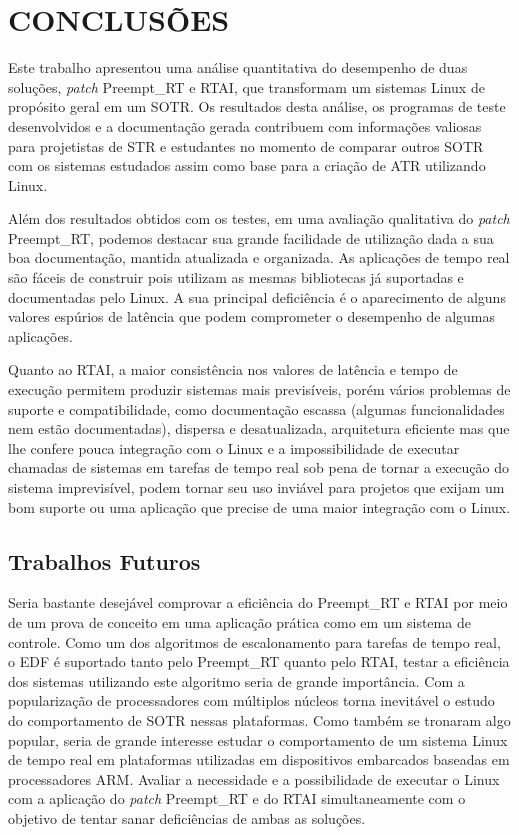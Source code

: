 \chapter{CONCLUSÕES}
\label{cap:conclusoes}
Este trabalho apresentou uma análise quantitativa do desempenho de duas soluções, \textit{patch} Preempt\_RT  e RTAI, que transformam um sistemas Linux de propósito geral em um SOTR. Os resultados desta análise, os programas de teste desenvolvidos e a documentação gerada contribuem com informações valiosas para projetistas de STR e estudantes no momento de comparar outros SOTR com os sistemas estudados assim como base para a criação de ATR utilizando Linux.

Além dos resultados obtidos com os testes, em uma avaliação qualitativa do \textit{patch} Preempt\_RT, podemos destacar sua grande facilidade de utilização dada a sua boa documentação, mantida atualizada e organizada. As aplicações de tempo real são fáceis de construir pois utilizam as mesmas bibliotecas já suportadas e documentadas pelo Linux. A sua principal deficiência é o aparecimento de alguns valores espúrios de latência que podem comprometer o desempenho de algumas aplicações.

Quanto ao RTAI, a maior consistência nos valores de latência e tempo de execução permitem produzir sistemas mais previsíveis, porém vários problemas de suporte e compatibilidade, como documentação escassa (algumas funcionalidades nem estão documentadas), dispersa e desatualizada, arquitetura eficiente mas que lhe confere pouca integração com o Linux e a impossibilidade de executar chamadas de sistemas em tarefas de tempo real sob pena de tornar a execução do sistema imprevisível, podem tornar seu uso inviável para projetos que exijam um bom suporte ou uma aplicação que precise de uma maior integração com o Linux.

\section{Trabalhos Futuros}
Seria bastante desejável comprovar a eficiência do Preempt\_RT e RTAI por meio de um prova de conceito em uma aplicação prática como em um sistema de controle.
Como um dos algoritmos de escalonamento para tarefas de tempo real, o EDF é suportado tanto  pelo Preempt\_RT quanto pelo RTAI, testar a eficiência dos sistemas utilizando este algoritmo seria de grande importância.
Com a popularização de processadores com múltiplos núcleos torna inevitável o estudo do comportamento de SOTR nessas plataformas. Como também se tronaram algo popular, seria de grande interesse estudar o comportamento de um sistema Linux de tempo real em plataformas utilizadas em dispositivos embarcados baseadas em processadores ARM.
Avaliar a necessidade e a possibilidade de executar o Linux com a aplicação do \textit{patch} Preempt\_RT e do RTAI simultaneamente com o objetivo de tentar sanar deficiências de ambas as soluções.
